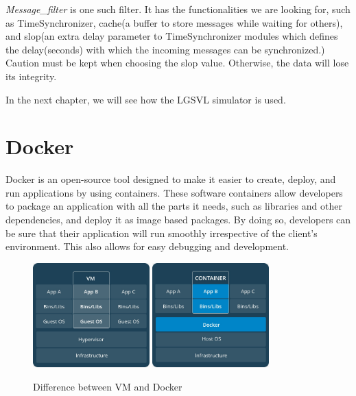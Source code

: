 \textit{Message\_filter} \cite{messagefilters} is one such filter. It has the
functionalities we are looking for, such as TimeSynchronizer, cache(a buffer to store
messages while waiting for others), and slop(an extra delay parameter to TimeSynchronizer
modules which defines the delay(seconds) with which the incoming messages can be
synchronized.) Caution must be kept when choosing the slop value. Otherwise, the data will
lose its integrity.

In the next chapter, we will see how the LGSVL \cite{rong2020lgsvl} simulator is used.

\section{Docker}
Docker \cite{dockergettingstarted} is an open-source tool designed to make it easier to create, deploy, and run applications by
using containers. These software containers allow developers to package an application
with all the parts it needs, such as libraries and other dependencies, and deploy it as
image based packages. By doing so, developers can be sure that their application will run smoothly
irrespective of the client's environment. This also allows for easy debugging and
development.

\begin{figure}
    \centering
    {\includegraphics[width=0.4\textwidth]{figures/inkscape/VM.jpeg}}
    \quad
    {\includegraphics[width=0.4\textwidth ]{figures/inkscape/dockerarchi.jpeg}}
    \caption{Difference between VM and Docker}
    \label{fig:vmvsdocker}

\end{figure}

